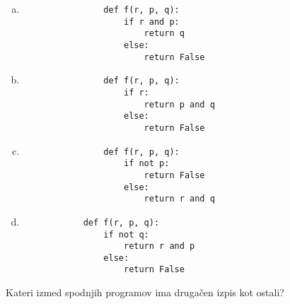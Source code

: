 \documentclass[arhiv, 10pt]{../izpit}
\begin{document}
        \begin{multicols}{2}
        \begin{enumerate}[(a)]
\item 
                \begin{verbatim}
                def f(r, p, q):
                    if r and p:
                        return q
                    else:
                        return False
                \end{verbatim}
            
\item 
                \begin{verbatim}
                def f(r, p, q):
                    if r:
                        return p and q
                    else:
                        return False
                \end{verbatim}
            
\item 
                \begin{verbatim}
                def f(r, p, q):
                    if not p:
                        return False
                    else:
                        return r and q
                \end{verbatim}
            
\item 
            \begin{verbatim}
            def f(r, p, q):
                if not q:
                    return r and p
                else:
                    return False
            \end{verbatim}
        
\end{enumerate}

        \end{multicols}
    
        \naloga*
        
        Kateri izmed spodnjih programov ima drugačen izpis kot ostali?
    
\end{document}
